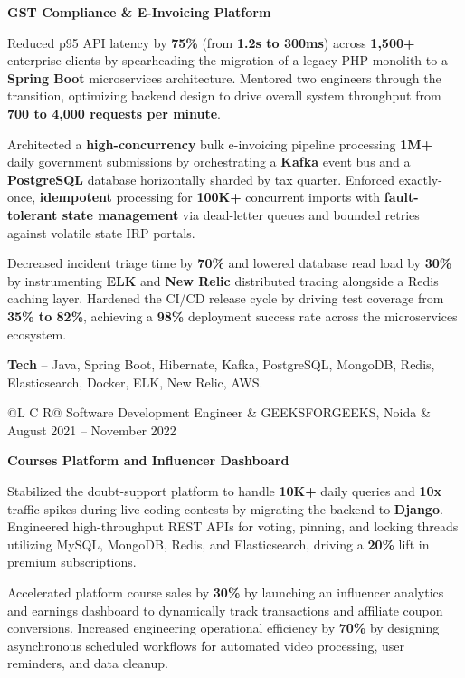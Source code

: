 \textcolor{Project}{\textbf{GST Compliance \& E-Invoicing Platform}}
\vspace{-0.88ex}
\begin{zitemize}
    \item Reduced p95 API latency by \textbf{75\%} (from \textbf{1.2s to 300ms}) across \textbf{1,500+} enterprise clients by spearheading the migration of a legacy PHP monolith to a \textbf{Spring Boot} microservices architecture. Mentored two engineers through the transition, optimizing backend design to drive overall system throughput from \textbf{700 to 4,000 requests per minute}.
    \item Architected a \textbf{high-concurrency} bulk e-invoicing pipeline processing \textbf{1M+} daily government submissions by orchestrating a \textbf{Kafka} event bus and a \textbf{PostgreSQL} database horizontally sharded by tax quarter. Enforced exactly-once, \textbf{idempotent} processing for \textbf{100K+} concurrent imports with \textbf{fault-tolerant state management} via dead-letter queues and bounded retries against volatile state IRP portals.
    \item Decreased incident triage time by \textbf{70\%} and lowered database read load by \textbf{30\%} by instrumenting \textbf{ELK} and \textbf{New Relic} distributed tracing alongside a Redis caching layer. Hardened the CI/CD release cycle by driving test coverage from \textbf{35\% to 82\%}, achieving a \textbf{98\%} deployment success rate across the microservices ecosystem.
    \item \textbf{Tech} -- Java, Spring Boot, Hibernate, Kafka, PostgreSQL, MongoDB, Redis, Elasticsearch, Docker, ELK, New Relic, AWS.
\end{zitemize}

\noindent
\begin{tabularx}{\textwidth}{@{}L C R@{}}
\textcolor{role}{Software Development Engineer} & \textcolor{company}{GEEKSFORGEEKS, Noida} & \textcolor{date}{August 2021 -- November 2022}\\
\end{tabularx}
\vspace{-1.6ex}

\textcolor{Project}{\textbf{Courses Platform and Influencer Dashboard}}
\vspace{-0.88ex}
\begin{zitemize}
    \item Stabilized the doubt-support platform to handle \textbf{10K+} daily queries and \textbf{10x} traffic spikes during live coding contests by migrating the backend to \textbf{Django}. Engineered high-throughput REST APIs for voting, pinning, and locking threads utilizing MySQL, MongoDB, Redis, and Elasticsearch, driving a \textbf{20\%} lift in premium subscriptions.
    \item Accelerated platform course sales by \textbf{30\%} by launching an influencer analytics and earnings dashboard to dynamically track transactions and affiliate coupon conversions. Increased engineering operational efficiency by \textbf{70\%} by designing asynchronous scheduled workflows for automated video processing, user reminders, and data cleanup.
\end{zitemize}

